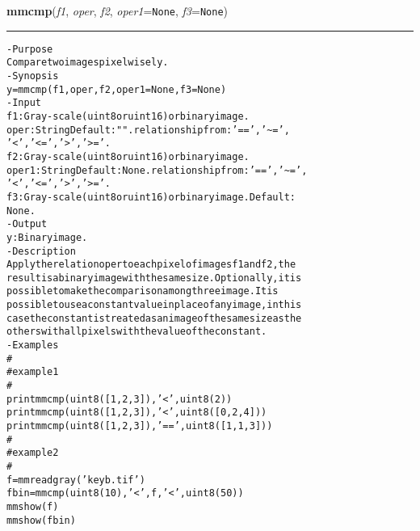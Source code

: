     \begin{boxedminipage}{\textwidth}

    \raggedright \textbf{mmcmp}(\textit{f1}, \textit{oper}, \textit{f2}, \textit{oper1}=\texttt{N\-o\-n\-e\-}, \textit{f3}=\texttt{N\-o\-n\-e\-})

    \vspace{-1.5ex}

    \rule{\textwidth}{0.5\fboxrule}
\begin{alltt}
- Purpose
    Compare two images pixelwisely.
- Synopsis
    y = mmcmp(f1, oper, f2, oper1=None, f3=None)
- Input
    f1:    Gray-scale (uint8 or uint16) or binary image.
    oper:  String Default: "". relationship from: '==', '{\textasciitilde}=',
           '{\textless}','{\textless}=', '{\textgreater}', '{\textgreater}='.
    f2:    Gray-scale (uint8 or uint16) or binary image.
    oper1: String Default: None. relationship from: '==', '{\textasciitilde}=',
           '{\textless}','{\textless}=', '{\textgreater}', '{\textgreater}='.
    f3:    Gray-scale (uint8 or uint16) or binary image. Default:
           None.
- Output
    y: Binary image.
- Description
    Apply the relation oper to each pixel of images f1 and f2 , the
    result is a binary image with the same size. Optionally, it is
    possible to make the comparison among three image. It is
    possible to use a constant value in place of any image, in this
    case the constant is treated as an image of the same size as the
    others with all pixels with the value of the constant.
- Examples
    \#
    \#   example 1
    \#
    print mmcmp(uint8([1, 2, 3]),'{\textless}', uint8(2))
    print mmcmp(uint8([1, 2, 3]),'{\textless}', uint8([0, 2, 4]))
    print mmcmp(uint8([1, 2, 3]),'==', uint8([1, 1, 3]))
    \#
    \#   example 2
    \#
    f=mmreadgray('keyb.tif')
    fbin=mmcmp(uint8(10), '{\textless}', f, '{\textless}', uint8(50))
    mmshow(f)
    mmshow(fbin)\end{alltt}

    \vspace{1ex}

    \end{boxedminipage}

    \label{multireg:num_pymorph:mmconcat}
    \vspace{0.5ex}


